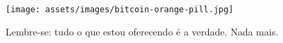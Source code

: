 \begin{figure}
  \texttt{[image: assets/images/bitcoin-orange-pill.jpg]}
  \caption*{Lembre-se: tudo o que estou oferecendo é a verdade. Nada mais.}
  \label{fig:bitcoin-orange-pill}
\end{figure}

%
%
%
